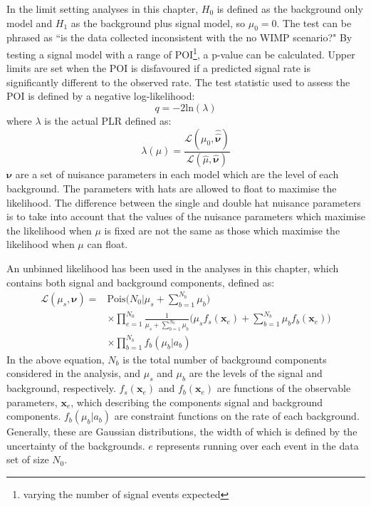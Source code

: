 \par
In the limit setting analyses in this chapter, $H_0$ is defined as the background only model and $H_1$ as the background plus signal model, so $\mu_0=0$.
The test can be phrased as ``is the data collected inconsistent with the no WIMP scenario?"
By testing a signal model with a range of POI\footnote{varying the number of signal events expected}, a p-value can be calculated. 
Upper limits are set when the POI is disfavoured if a predicted signal rate is significantly different to the observed rate.
The test statistic used to assess the POI is defined by a negative log-likelihood:
\begin{equation}
    q = -2 \text{ln}(\lambda)
\end{equation}
where $\lambda$ is the actual PLR defined as:
\begin{equation}
    \lambda(\mu) = \frac{\mathcal{L}(\mu_0, \boldsymbol{\hat{\hat{\nu}}})}{\mathcal{L}(\hat{\mu}, \boldsymbol{\hat{\nu}})}
\end{equation}
$\boldsymbol{\nu}$ are a set of nuisance parameters in each model which are the level of each background.
The parameters with hats are allowed to float to maximise the likelihood.
The difference between the single and double hat nuisance parameters is to take into account that the values of the nuisance parameters which maximise the likelihood when $\mu$ is fixed are not the same as those which maximise the likelihood when $\mu$ can float.
\par
An unbinned likelihood has been used in the analyses in this chapter, which contains both signal and background components, defined as:
\begin{equation}
\begin{split}
    \mathcal{L}(\mu_s,\boldsymbol{\nu}) =& \text{Pois} \bigg(N_0 | \mu_s + \sum^{N_b}_{b=1} \mu_b \bigg) \\
                                         & \times \prod^{N_0}_{e=1} \frac{1}{\mu_s + \sum^{N_b}_{b=1} \mu_b} \bigg( \mu_s f_s (\boldsymbol{x}_e) + \sum^{N_b}_{b=1} \mu_b f_b(\boldsymbol{x}_e) \bigg) \\
                                         & \times \prod^{N_b}_{b=1} f_b(\mu_b | a_b)
\end{split}
\end{equation}
In the above equation, $N_b$ is the total number of background components considered in the analysis, and $\mu_s$ and $\mu_b$ are the levels of the signal and background, respectively. 
$f_s(\boldsymbol{x}_e)$ and $f_b(\boldsymbol{x}_e)$ are functions of the observable parameters,  $\boldsymbol{x}_e$, which describing the components signal and background components.
$f_b(\mu_b | a_b)$ are constraint functions on the rate of each background.
Generally, these are Gaussian distributions, the width of which is defined by the uncertainty of the backgrounds.
$e$ represents running over each event in the data set of size $N_0$.

